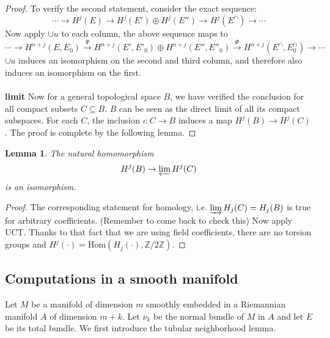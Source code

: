 \documentclass[12pt]{article}
\theoremstyle{plain}
\newtheorem{lemma}[equation]{Lemma}
\theoremstyle{definition}
\newcommand{\IZ}{\mathbb{Z}}
\newcommand{\Hom}{\mathrm{Hom}}
\newcommand{\<}{\langle}
\renewcommand{\>}{\rangle}
\newcommand{\invlim}{\varprojlim}
\begin{document}
\begin{proof}
To verify the second statement, consider the exact sequence: 
$$ \cdots \to H^j(E) \to H^j(E') \oplus H^j(E'') \to H^j(E^\cap) \to \cdots $$
Now apply $\cup u $ to each column, the above sequence maps to 
$$ \cdots \to H^{n + j}(E, E_0) \stackrel{\Psi}{\to} H^{n + j}(E', E'_0) \oplus H^{n + j}(E'', E''_0) \stackrel{\Phi}{\to} H^{n + j}(E^\cap, E^\cap_0) \to \cdots $$ 
$\cup u$ induces an isomorphism on the second and third column, and therefore also induces an isomorphism on the first. \\\\
\textbf{limit}
Now for a general topological space $B$, we have verified the conclusion for all compact subsets $C \subseteq B$. $B$ can be seen as the direct limit of all its compact subspaces. For each $C$, the inclusion $\iota : C \to B$ induces a map $H^j(B) \to H^j(C)$. The proof is complete by the following lemma. 
\end{proof}
\begin{lemma}
The natural homomorphism $$ H^j(B) \to \invlim H^j(C) $$ is an isomorphism. 
\end{lemma}
\begin{proof}
The corresponding statement for homology, i.e. $\varinjlim H_j(C) = H_j(B)$ is true for arbitrary coefficients. (Remember to come back to check this) Now apply UCT. Thanks to that fact that we are using field coefficients, there are no torsion groups and $H^j(\cdot) = \Hom(H_j(\cdot), \IZ/2\IZ)$.
\end{proof}

\subsection{Computations in a smooth manifold}
Let $M$ be a manifold of dimension $m$ smoothly embedded in a Riemannian manifold $A$ of dimension $m + k$. Let $\nu_k$ be the normal bundle of $M$ in $A$ and let $E$ be its total bundle. 
We first introduce the tubular neighborhood lemma. 
\end{document}
